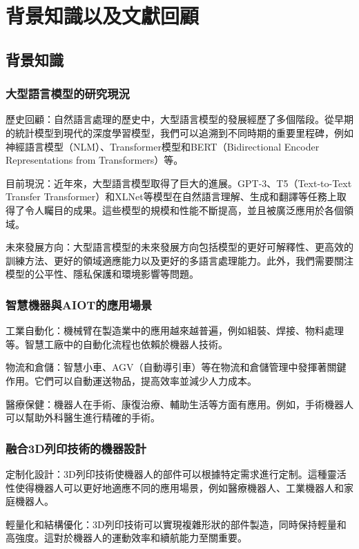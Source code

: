 \documentclass[class=NCU_thesis, crop=false]{standalone}
\begin{document}
\chapter{背景知識以及文獻回顧}

\section{背景知識}
\subsection{大型語言模型的研究現況}

歷史回顧：自然語言處理的歷史中，大型語言模型的發展經歷了多個階段。從早期的統計模型到現代的深度學習模型，我們可以追溯到不同時期的重要里程碑，例如神經語言模型（NLM）、Transformer模型和BERT（Bidirectional Encoder Representations from Transformers）等。

目前現況：近年來，大型語言模型取得了巨大的進展。GPT-3、T5（Text-to-Text Transfer Transformer）和XLNet等模型在自然語言理解、生成和翻譯等任務上取得了令人矚目的成果。這些模型的規模和性能不斷提高，並且被廣泛應用於各個領域。

未來發展方向：大型語言模型的未來發展方向包括模型的更好可解釋性、更高效的訓練方法、更好的領域適應能力以及更好的多語言處理能力。此外，我們需要關注模型的公平性、隱私保護和環境影響等問題。

\subsection{智慧機器與AIOT的應用場景}

工業自動化：機械臂在製造業中的應用越來越普遍，例如組裝、焊接、物料處理等。智慧工廠中的自動化流程也依賴於機器人技術。

物流和倉儲：智慧小車、AGV（自動導引車）等在物流和倉儲管理中發揮著關鍵作用。它們可以自動運送物品，提高效率並減少人力成本。

醫療保健：機器人在手術、康復治療、輔助生活等方面有應用。例如，手術機器人可以幫助外科醫生進行精確的手術。

\subsection{融合3D列印技術的機器設計}

定制化設計：3D列印技術使機器人的部件可以根據特定需求進行定制。這種靈活性使得機器人可以更好地適應不同的應用場景，例如醫療機器人、工業機器人和家庭機器人。

輕量化和結構優化：3D列印技術可以實現複雜形狀的部件製造，同時保持輕量和高強度。這對於機器人的運動效率和續航能力至關重要。
\end{document}
